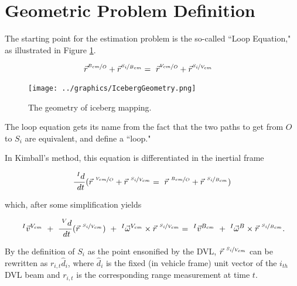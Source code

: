 
\section{Geometric Problem Definition}

The starting point for the estimation problem is the so-called ``Loop Equation," as illustrated in Figure \ref{fig:LoopEquation}.

\begin{align}
\vec{r}^{\nicefrac{B_{cm}}{O}} + \vec{r}^{\nicefrac{S_i}{B_{cm}}} &= ~\vec{r}^{\nicefrac{V_{cm}}{O}} + \vec{r}^{\nicefrac{S_i}{V_{cm}}}
\end{align}

\begin{figure}[htbp]
   \centering
   \texttt{[image: ../graphics/IcebergGeometry.png]} %
   \caption{The geometry of iceberg mapping. }  
    \label{fig:LoopEquation}
\end{figure}

The loop equation gets its name from the fact that the two paths to get from $O$ to $S_i$ are equivalent, and define a ``loop."

In Kimball's method, this equation is differentiated in the inertial frame

\begin{equation} %
   \frac{~^Id}{~dt}(\vec{r}^{~\nicefrac{V_{cm}}{O}} + \vec{r}^{~\nicefrac{S_i}{V_{cm}}} = ~ \vec{r}^{~\nicefrac{B_{cm}}{O}} + \vec{r}^{~\nicefrac{S_i}{B_{cm}}})\\
   \end{equation}
   
   which, after some simplification yields 
   
       \begin{equation}
    ~^{I}\vec{v}^{V_{cm}} ~+~ \frac{~^Vd}{~dt}(\vec{r}^{~\nicefrac{S_i}{V_{cm}}} ) ~+~ ^{I}\vec{\omega}^{V_{cm}}\times\vec{r}^{~\nicefrac{S_i}{V_{cm}}}  = 
    ~^{I}\vec{v}^{B_{cm}} ~+~^{I}\vec{\omega}^{B}\times\vec{r}^{~\nicefrac{S_i}{B_{cm}}}. \\
\end{equation}

By the definition of $S_i$ as the point ensonified by the DVL,  $\vec{r}^{~\nicefrac{S_i}{V_{cm}}}$ can be rewritten as $r_{i,t}\hat{d}_{i} $, where $\hat{d}_{i} $ is the fixed (in vehicle frame) unit vector of the $i_{th}$ DVL beam and $r_{i,t} $ is the corresponding range measurement at time $t$.  

